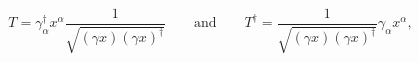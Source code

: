 \begin{equation}
 T=\gamma_\alpha^\dagger x^\alpha\frac{1}{\sqrt{(\gamma x)
 (\gamma x)^\dagger}}\qquad\text{and}\qquad
 T^\dagger=\frac{1}{\sqrt{(\gamma x)(\gamma x)^\dagger}}\gamma_\alpha 
 x^\alpha,
\end{equation}

